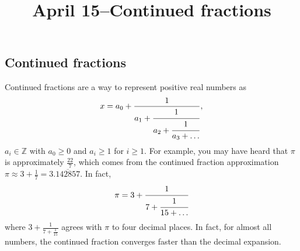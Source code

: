 \documentclass{ximera}
\title{April 15--Continued fractions}
\begin{document}
  
\begin{abstract}  
\end{abstract}  
\maketitle  

\subsection{Continued fractions}
Continued fractions are a way to represent positive real numbers as
\[x=a_0+\frac{1}{a_1+\cfrac{1}{a_2+\cfrac{1}{a_3+\dots}}},\]
$a_i\in\mathbb{Z}$ with $a_0\geq 0$ and $a_i\geq 1$ for $i\geq 1$. For example, you may have heard that $\pi$ is approximately $\frac{22}{7}$, which comes from the continued fraction approximation $\pi\approx3+\frac{1}{7}=3.\overline{142857}$. In fact, 
\begin{equation}\label{merriman_pi}\pi=3+\cfrac{1}{7+\cfrac{1}{15+\dots}}\end{equation}
where $3+\frac{1}{7+\frac{1}{15}}$ agrees with $\pi$ to four decimal places. In fact, for almost all numbers, the continued fraction converges faster than the decimal expansion. 
 
\end{document}

